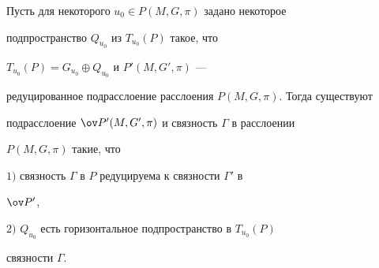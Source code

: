  


\begin{thm} 


Пусть для некоторого $u_0\in P(M,G,\pi)$ задано некоторое


подпространство $Q_{u_0}$ из $T_{u_0}(P)$ такое, что 


$T_{u_0}(P)=G_{u_0}\oplus Q_{u_0}$ и $P'(M,G',\pi)$ --- 


редуцированное подрасслоение расслоения $P(M,G,\pi)$. Тогда существуют 


подрасслоение $\ov P{}'(M,G',\pi)$ и связность $\Gamma$ в расслоении 


$P(M,G,\pi)$ такие, что 


 


$1)$ связность $\Gamma$ в $P$ редуцируема к связности $\Gamma'$ в 


$\ov P{}'$, 


 


$2)$ $Q_{u_0}$ есть горизонтальное подпространство в $T_{u_0}(P)$ 


связности $\Gamma$. 


\end{thm} 


 


